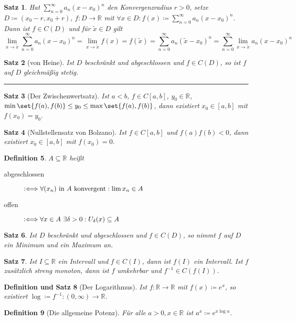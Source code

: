 \documentclass[a4paper]{article}
\newcounter{Sec}
\theoremstyle{marginbreak}
\newtheorem{definition}{Definition}[Sec]
\newtheorem{satz}[definition]{Satz}
\newtheorem{defsatz}[definition]{Definition und Satz}
\newcommand{\sep}{%
	\rule{\textwidth}{0.3pt}%
	\stepcounter{Sec}%
	}
\newcommand{\defiff}{\mathrel{\vcentcolon\Longleftrightarrow}}
\newcommand{\series}[1][1]{\sum_{n=#1}^\infty}
\newcommand{\ps}[1][a]{\series[0]#1_n(x-x_0)^n}
\begin{document}
	\begin{satz}
		Hat $\ps$ den Konvergenzradius $r>0$, setze $D\coloneqq(x_0-r,x_0+r)$,
		$f\colon D\to\mathbb{R}$ mit $\forall x\in D:f(x)\coloneqq\ps$. Dann
		ist $f\in C(D)$ und für $\tilde{x}\in D$ gilt
		\[ \lim_{x\to\tilde{x}}\ps = \lim_{x\to\tilde{x}}f(x)=f(\tilde{x})=
		\sum_{n=0}^\infty a_n(\tilde{x}-x_0)^n=\sum_{n=0}^\infty\lim_{x\to\tilde{x}}a_n(x-x_0)^n \]
	\end{satz}
	\begin{satz}[von Heine]
		Ist $D$ beschränkt und abgeschlossen und $f\in C(D)$, so ist $f$ auf
		$D$ gleichmäßig stetig.
	\end{satz}
	\sep
	\begin{satz}[Der Zwischenwertsatz]
		Ist $a<b$, $f\in C[a,b]$, $y_0\in\mathbb{R}$, $\min\set{f(a),f(b)}\leq
		y_0\leq\max\set{f(a),f(b)}$, dann existiert $x_0\in[a,b]$ mit $f(x_0)=y_0$.
	\end{satz}
	\begin{satz}[Nullstellensatz von Bolzano]
		Ist $f\in C[a,b]$ und $f(a)f(b)<0$, dann existiert $x_0\in[a,b]$ mit $f(x_0)=0$.
	\end{satz}
	\begin{definition}
		$A\subseteq\mathbb{R}$ heißt
		\begin{description}
			\item[abgeschlossen] $\defiff\forall(x_n)~\text{in}~A~\text{konvergent}:\lim x_n\in A$
			\item[offen] $\defiff\forall x\in A~\exists\delta>0:U_\delta(x)\subseteq A$
		\end{description}
	\end{definition}
	\begin{satz}
		Ist $D$ beschränkt und abgeschlossen und $f\in C(D)$, so nimmt $f$ auf $D$
		ein Minimum und ein Maximum an.
	\end{satz}
	\begin{satz}
		Ist $I\subseteq\mathbb{R}$ ein Intervall und $f\in C(I)$, dann ist
		$f(I)$ ein Intervall. Ist $f$ zusätzlich streng monoton, dann ist $f$
		umkehrbar und $f^{-1}\in C(f(I))$.
	\end{satz}
	\begin{defsatz}[Der Logarithmus]
		Ist $f\colon\mathbb{R}\to\mathbb{R}$ mit $f(x)\coloneqq e^x$, so existiert
		$\log \coloneqq f^{-1}\colon (0,\infty)\to\mathbb{R}$.
	\end{defsatz}
	\begin{definition}[Die allgemeine Potenz]
		Für alle $a>0, x\in\mathbb{R}$ ist $a^x\coloneqq e^{x\log a}$.
	\end{definition}
\end{document}
